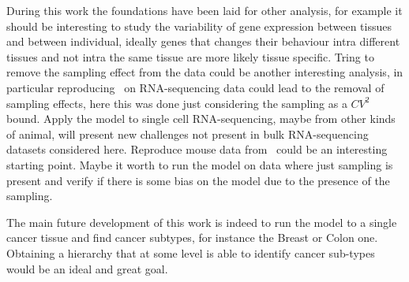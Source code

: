 During this work the foundations have been laid for other analysis, for example it should be interesting to study the variability of gene expression between tissues and between individual, ideally genes that changes their behaviour intra different tissues and not intra the same tissue are more likely tissue specific. Tring to remove the sampling effect from the data could be another interesting analysis, in particular reproducing~\cite{Grilli} on RNA-sequencing data could lead to the removal of sampling effects, here this was done just considering the sampling as a $CV^2$ bound. Apply the model to single cell RNA-sequencing, maybe from other kinds of animal, will present new challenges not present in bulk RNA-sequencing datasets considered here. Reproduce mouse data from~\cite{Scialdone2016} could be an interesting starting point. Maybe it worth to run the model on data where just sampling is present and verify if there is some bias on the model due to the presence of the sampling.

The main future development of this work is indeed to run the model to a single cancer tissue and find cancer subtypes, for instance the Breast or Colon one. Obtaining a hierarchy that at some level is able to identify cancer sub-types would be an ideal and great goal. 